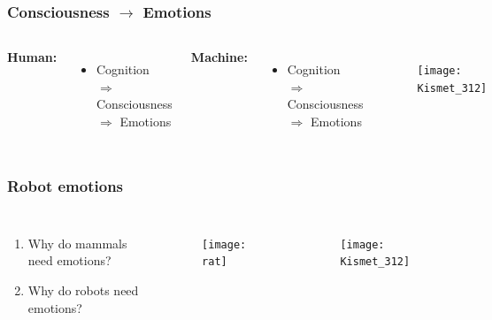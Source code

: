 \documentclass[12pt, aspectratio=169]{beamer}
\begin{document}
\begin{frame}
\frametitle{Consciousness $\rightarrow$ Emotions}
\begin{columns}[c] %

\textbf{Human:}
\begin{itemize}
\item Cognition $\Rightarrow$ Consciousness $\Rightarrow$ Emotions
\end{itemize}

\textbf{Machine:}
\begin{itemize}
\item Cognition $\Rightarrow$ Consciousness $\Rightarrow$ Emotions
\end{itemize}

\begin{figure}
\texttt{[image: Kismet\_312]}
\end{figure}
\end{columns}
\end{frame}


\begin{frame}
\frametitle{Robot emotions}
\begin{columns}[c] %

\begin{enumerate}
\item Why do mammals need emotions?
\item Why do robots need emotions?
\end{enumerate}

\begin{figure}
\texttt{[image: rat]}
\end{figure}

\begin{figure}
\texttt{[image: Kismet\_312]}
\end{figure}
\end{columns}
\end{frame}
\end{document}
